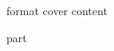 \documentclass[a4paper,11pt,titlepage]{article}
\begin{document}
{format}
{cover}
{content}

{}\sloppy\raggedbottom
{}
{part}

\begin{small}


\end{small}
\end{document}
